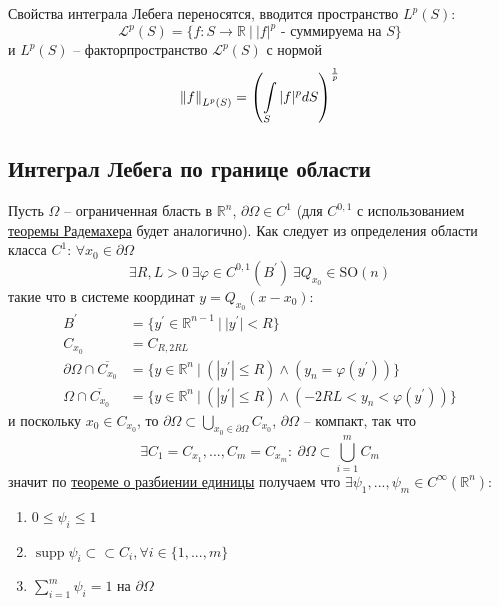 \documentclass[12pt,a4paper]{article}
\newcommand{\intset}[1]{\int\limits_{#1}}
\newcommand{\Real}{\mathbb{R}}
\newcommand{\ssubset}{\subset \subset}
\DeclareMathOperator\supp{supp}
\begin{document}
Свойства интеграла Лебега переносятся, вводится пространство $L^p (S)$:
\begin{equation*}
\mathcal{L}^p (S) = \{ f : S \to \Real \ | \ |f|^p \text{ - суммируема на } S \}
\end{equation*}
и $L^p (S)$ -- факторпространство $\mathcal{L}^p (S)$ с нормой
\begin{equation*}
\norm{f}_{L^p (S)} = \left(\intset{S}{|f|^p dS}\right)^{\frac{1}{p}}
\end{equation*}

\subsection{Интеграл Лебега по границе области}

Пусть $\Omega$ -- ограниченная бласть в $\Real^n$, $\partial \Omega \in C^1$ (для $C^{0,1}$ с использованием \hyperref[th:2]{теоремы Радемахера} будет аналогично). Как следует из определения области класса $C^1$: $\forall x_0 \in \partial \Omega$
\begin{equation*}
	\exists R, L > 0 \ \exists \varphi \in C^{0, 1} (B^\prime) \ \exists Q_{x_0} \in \text{SO}(n)
\end{equation*}
такие что в системе координат $y = Q_{x_0} (x - x_0)$:
\begin{align*}
	B^\prime &= \{ y^\prime \in \Real^{n-1} \ | \ |y^\prime| < R \} \\
	C_{x_0} &= C_{R, 2RL} \\
	\partial \Omega \cap \overline{C_{x_0}} &= \{ y \in \Real^n \ | \ (|y^\prime| \leq R) \wedge (y_n = \varphi(y^\prime)) \} \\
	\Omega \cap \overline{C_{x_0}} &= \{ y \in \Real^n \ | \ (|y^\prime| \leq R) \wedge (-2RL < y_n < \varphi(y^\prime)) \}
\end{align*}
и поскольку $x_0 \in C_{x_0}$, то $\partial \Omega \subset \bigcup\limits_{x_0 \in \partial \Omega}{C_{x_0}}$, $\partial \Omega$ -- компакт, так что
\begin{equation*}
	\exists C_1 = C_{x_1}, ..., C_m = C_{x_m}: \ \partial \Omega \subset \bigcup\limits_{i=1}^{m}{C_m}
\end{equation*}
значит по \hyperref[th:3]{теореме о разбиении единицы} получаем что $\exists \psi_1, ..., \psi_m \in C^\infty (\Real^n)$:
\begin{enumerate}
	\item $0 \leq \psi_i \leq 1$
	\item $\supp \psi_i \ssubset C_i, \forall i \in \{1, ..., m\}$
	\item $\sum\limits_{i=1}^{m}{\psi_i} = 1$ на $\partial \Omega$
\end{enumerate}
\end{document}
